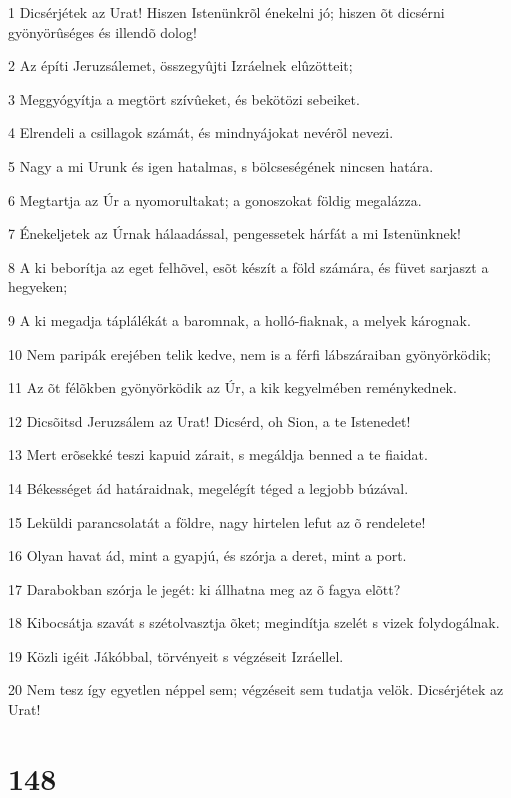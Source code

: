 \par 1 Dicsérjétek az Urat! Hiszen Istenünkrõl énekelni jó; hiszen õt dicsérni gyönyörûséges és illendõ dolog!
\par 2 Az építi Jeruzsálemet, összegyûjti Izráelnek elûzötteit;
\par 3 Meggyógyítja a megtört szívûeket, és bekötözi sebeiket.
\par 4 Elrendeli a csillagok számát, és mindnyájokat nevérõl nevezi.
\par 5 Nagy a mi Urunk és igen hatalmas, s bölcseségének nincsen határa.
\par 6 Megtartja az Úr a nyomorultakat; a gonoszokat földig megalázza.
\par 7 Énekeljetek az Úrnak hálaadással, pengessetek hárfát a mi Istenünknek!
\par 8 A ki beborítja az eget felhõvel, esõt készít a föld számára, és füvet sarjaszt a hegyeken;
\par 9 A ki megadja táplálékát a baromnak, a holló-fiaknak, a melyek kárognak.
\par 10 Nem paripák erejében telik kedve, nem is a férfi lábszáraiban gyönyörködik;
\par 11 Az õt félõkben gyönyörködik az Úr, a kik kegyelmében reménykednek.
\par 12 Dicsõitsd Jeruzsálem az Urat! Dicsérd, oh Sion, a te Istenedet!
\par 13 Mert erõsekké teszi kapuid zárait, s megáldja benned a te fiaidat.
\par 14 Békességet ád határaidnak, megelégít téged a legjobb búzával.
\par 15 Leküldi parancsolatát a földre, nagy hirtelen lefut az õ rendelete!
\par 16 Olyan havat ád, mint a gyapjú, és szórja a deret, mint a port.
\par 17 Darabokban szórja le jegét: ki állhatna meg az õ fagya elõtt?
\par 18 Kibocsátja szavát s szétolvasztja õket; megindítja szelét s vizek folydogálnak.
\par 19 Közli igéit Jákóbbal, törvényeit s végzéseit Izráellel.
\par 20 Nem tesz így egyetlen néppel sem; végzéseit sem tudatja velök. Dicsérjétek az Urat!

\chapter{148}


